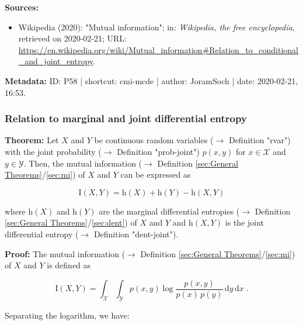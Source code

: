 \documentclass[a4paper,12pt]{book}
\begin{document}
\vspace{1em}
\textbf{Sources:}
\begin{itemize}
\item Wikipedia (2020): "Mutual information"; in: \textit{Wikipedia, the free encyclopedia}, retrieved on 2020-02-21; URL: \url{https://en.wikipedia.org/wiki/Mutual_information#Relation_to_conditional_and_joint_entropy}.
\end{itemize}


\vspace{1em}
\textbf{Metadata:} ID: P58 | shortcut: cmi-mcde | author: JoramSoch | date: 2020-02-21, 16:53.


\subsubsection[\textbf{Relation to marginal and joint differential entropy}]{Relation to marginal and joint differential entropy} \label{sec:cmi-mjde}

\vspace{1em}
\textbf{Theorem:} Let $X$ and $Y$ be continuous random variables ($\rightarrow$ Definition "rvar") with the joint probability ($\rightarrow$ Definition "prob-joint") $p(x,y)$ for $x \in \mathcal{X}$ and $y \in \mathcal{Y}$. Then, the mutual information ($\rightarrow$ Definition \ref{sec:General Theorems}/\ref{sec:mi}) of $X$ and $Y$ can be expressed as

\begin{equation} \label{eq:cmi-mjde-cmi-mjde}
\mathrm{I}(X,Y) = \mathrm{h}(X) + \mathrm{h}(Y) - \mathrm{h}(X,Y)
\end{equation}

where $\mathrm{h}(X)$ and $\mathrm{h}(Y)$ are the marginal differential entropies ($\rightarrow$ Definition \ref{sec:General Theorems}/\ref{sec:dent}) of $X$ and $Y$ and $\mathrm{h}(X,Y)$ is the joint differential entropy ($\rightarrow$ Definition "dent-joint").


\vspace{1em}
\textbf{Proof:} The mutual information ($\rightarrow$ Definition \ref{sec:General Theorems}/\ref{sec:mi}) of $X$ and $Y$ is defined as

\begin{equation} \label{eq:cmi-mjde-MI}
\mathrm{I}(X,Y) = \int_{\mathcal{X}} \int_{\mathcal{Y}} p(x,y) \log \frac{p(x,y)}{p(x)\,p(y)} \, \mathrm{d}y \, \mathrm{d}x \; .
\end{equation}

Separating the logarithm, we have:
\end{document}
